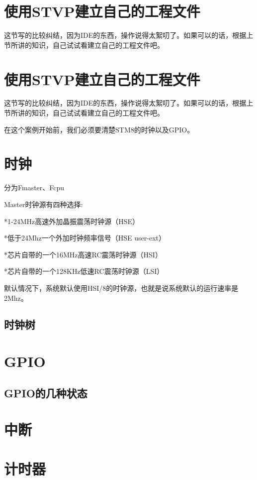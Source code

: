 \documentclass[a4paper]{book}
\begin{document}
\section{使用STVP建立自己的工程文件}

这节写的比较纠结，因为IDE的东西，操作说得太絮叨了。如果可以的话，根据上节所讲的知识，自己试试看建立自己的工程文件吧。

\section{使用STVP建立自己的工程文件}

这节写的比较纠结，因为IDE的东西，操作说得太絮叨了。如果可以的话，根据上节所讲的知识，自己试试看建立自己的工程文件吧。

在这个案例开始前，我们必须要清楚STM8的时钟以及GPIO。

\section{时钟}

分为Fmaster、Fcpu

Master时钟源有四种选择:

*1-24MHz高速外加晶振震荡时钟源（HSE）

*低于24Mhz一个外加时钟频率信号（HSE user-ext）

*芯片自带的一个16MHz高速RC震荡时钟源（HSI）

*芯片自带的一个128KHz低速RC震荡时钟源（LSI）

默认情况下，系统默认使用HSI/8的时钟源，也就是说系统默认的运行速率是2Mhz。

\subsection{时钟树}

\section{GPIO}

\subsection{GPIO的几种状态}

\section{中断}

\section{计时器}
\end{document}

